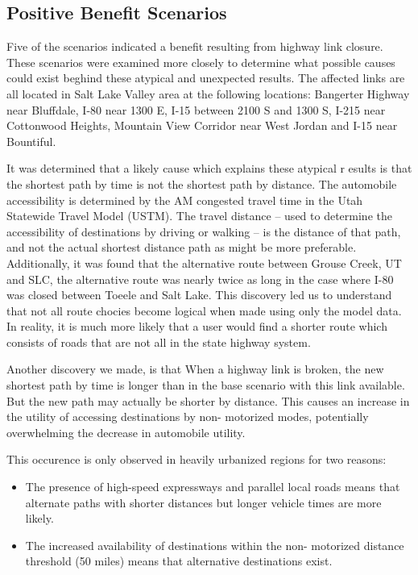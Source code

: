 \subsection{Positive Benefit Scenarios}

Five of the scenarios indicated a benefit resulting from highway link closure. These scenarios were examined more closely to determine what possible causes could exist beghind these atypical and unexpected results. The affected links are all located in Salt Lake Valley area at the following locations: Bangerter Highway near Bluffdale, I-80 near 1300 E, I-15 between 2100 S and 1300 S, I-215 near Cottonwood Heights, Mountain View Corridor near West Jordan and I-15 near Bountiful.

It was determined that a likely cause which explains these atypical r
esults is that the shortest path by time is not the shortest path by
distance. The automobile accessibility is determined by the AM congested
travel time in the Utah Statewide Travel Model (USTM). The travel distance
– used to determine the accessibility of destinations by driving or
walking – is the distance of that path, and not the actual shortest
distance path as might be more preferable. Additionally, it was found that
the alternative route between Grouse Creek, UT and SLC, the alternative
route was nearly twice as long in the case where I-80 was closed between
Toeele and Salt Lake. This discovery led us to understand that not all
route chocies become logical when made using only the model data. In
reality, it is much more likely that a user would find a shorter route
which consists of roads that are not all in the state highway system.

Another discovery we made, is that When a highway link is broken, the new
shortest path by time is longer than in the base scenario with this link
available. But the new path may actually be shorter by distance. This
causes an increase in the utility of accessing destinations by non-
motorized modes, potentially overwhelming the decrease in automobile
utility.

This occurence is only observed in heavily urbanized regions for two reasons:
\begin{itemize}
	\item The presence of high-speed expressways and parallel local roads
  means that alternate paths with shorter distances but longer vehicle
  times are more likely.
	\item The increased availability of destinations within the non-
  motorized distance threshold (50 miles) means that alternative
  destinations exist.
\end{itemize}

